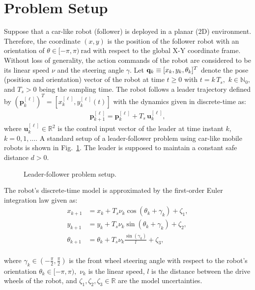 \documentclass[letterpaper]{article} %
\begin{document}
\section{Problem Setup} 
\label{sec:problemSetup}


Suppose that a car-like robot (follower) is deployed in a planar (2D) environment. Therefore, the coordinate $(x,y)$ is the position of the follower robot with an orientation of $\theta\in[-\pi,\pi)~\si{\radian}$ with respect to the global X-Y  coordinate frame.  Without loss of generality, the action commands of the robot are considered to be its linear speed $\nu$ and the steering angle $\gamma.$ Let ${\bf q}_k\equiv[x_k,y_k,\theta_k]^T$ denote the pose (position and orientation) vector of the robot at time $t\ge 0$ with $t=k \, T_s,$ $k\in\mathbb{N}_0,$ and $T_s>0$ being the sampling time.  The robot follows a leader trajectory defined by $(\mathbf{p}_k^{[\ell]})^T=[x_k^{[\ell]},y_k^{[\ell]}(t)]$ with the dynamics given in discrete-time as: %
%
\begin{align}
  \label{eq:leaderDT}
  \mathbf{p}_{k+1}^{[\ell]} = \mathbf{p}_k^{[\ell]} + T_s \, \mathbf{u}_k^{[\ell]},
\end{align}
%
where $\mathbf{u}_k^{[\ell]}\in\mathbb{R}^2$ is the control input vector of the leader at time instant $k,$ $k=0,1,\ldots.$ A standard setup of a leader-follower problem using car-like mobile robots is shown in Fig.~\ref{fig:leaderFollowerSetup}. The leader is supposed to maintain a constant safe distance $d>0.$
%
\begin{figure}
  \centering
  \caption{Leader-follower problem setup.}
  \label{fig:leaderFollowerSetup}
\end{figure}
%
The robot's discrete-time model is approximated by the first-order Euler integration law given as: %
%
\begin{subequations}
  \begin{align}
    x_{k+1}& =x_{k}+T_s\nu_{k}\cos{(\theta_{k}+\gamma_{k})} + \zeta_1,\\  
    y_{k+1}& =y_{k}+T_s\nu_{k}\sin{(\theta_{k}+\gamma_{k})}+ \zeta_2,\\
    \theta_{k+1}&=\theta_{k}+T_s\nu_{k}\frac{\sin{(\gamma_{k})}}{l}+ \zeta_3,
  \end{align}
\label{eq:robotModel1-DT}
\end{subequations}
\\
where $\gamma_k\in(-\frac{\pi}{2},\frac{\pi}{2})$ is the front wheel steering angle with respect to the robot's orientation $\theta_k\in[-\pi,\pi),$ $\nu_k$ is the linear speed, $l$ is the distance between the drive wheels of the robot, and $\zeta_1,\zeta_2,\zeta_3\in\mathbb{R}$ are the model uncertainties. %
\end{document}
